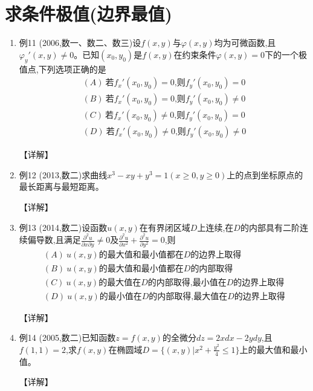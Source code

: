\documentclass[12pt, a4paper, oneside, UTF8]{ctexbook}
\begin{document}
\section{求条件极值(边界最值)}

\begin{enumerate}[label=\arabic*.,start=11]
    \item 例11 (2006,数一、数二、数三)设$f(x,y)$与$\varphi(x,y)$均为可微函数,且$\varphi_y'(x,y)\neq 0$。已知$(x_0,y_0)$是$f(x,y)$在约束条件$\varphi(x,y)=0$下的一个极值点,下列选项正确的是
    \begin{align*}
        (A)\ \text{若}f_x'(x_0,y_0)=0\text{,则}f_y'(x_0,y_0)=0 \\
        (B)\ \text{若}f_x'(x_0,y_0)=0\text{,则}f_y'(x_0,y_0)\neq 0 \\
        (C)\ \text{若}f_x'(x_0,y_0)\neq 0\text{,则}f_y'(x_0,y_0)=0 \\
        (D)\ \text{若}f_x'(x_0,y_0)\neq 0\text{,则}f_y'(x_0,y_0)\neq 0
    \end{align*}
    
    \begin{solution}
    【详解】
    \end{solution}
    
    \item 例12 (2013,数二)求曲线$x^3-xy+y^3=1(x\geq 0,y\geq 0)$上的点到坐标原点的最长距离与最短距离。
    
    \begin{solution}
    【详解】
    \end{solution}
    
    \item 例13 (2014,数二)设函数$u(x,y)$在有界闭区域$D$上连续,在$D$的内部具有二阶连续偏导数,且满足$\frac{\partial^2 u}{\partial x\partial y}\neq 0$及$\frac{\partial^2 u}{\partial x^2}+\frac{\partial^2 u}{\partial y^2}=0$,则
    \begin{align*}
        (A)\ u(x,y)\text{的最大值和最小值都在}D\text{的边界上取得} \\
        (B)\ u(x,y)\text{的最大值和最小值都在}D\text{的内部取得} \\
        (C)\ u(x,y)\text{的最大值在}D\text{的内部取得,最小值在}D\text{的边界上取得} \\
        (D)\ u(x,y)\text{的最小值在}D\text{的内部取得,最大值在}D\text{的边界上取得}
    \end{align*}
    
    \begin{solution}
    【详解】
    \end{solution}
    
    \item 例14 (2005,数二)已知函数$z=f(x,y)$的全微分$dz=2xdx-2ydy$,且$f(1,1)=2$,求$f(x,y)$在椭圆域$D=\{(x,y)|x^2+\frac{y^2}{4}\leq 1\}$上的最大值和最小值。
    
    \begin{solution}
    【详解】
    \end{solution}
\end{enumerate}

\ifx\allfiles\undefined
\end{document}
